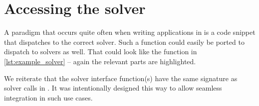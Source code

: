 
\section{Accessing the solver}
\label{sec:develop:solver}

A paradigm that occurs quite often when writing applications in \openqxd is a code snippet that dispatches to the correct solver.
Such a function could easily be ported to dispatch to \qudas solvers as well.
That could look like the function  in \cref{lst:example_solver} -- again the relevant parts are highlighted.

We reiterate that the solver interface function(s) have the same signature as solver calls in \openqxd.
It was intentionally designed this way to allow seamless integration in such use cases.

